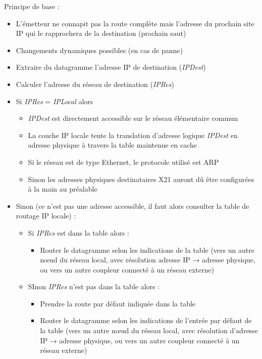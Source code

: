 \documentclass[journal, a4paper]{IEEEtran}
\begin{document}
Principe de base :
\begin{itemize}
	\item L'émetteur ne connapit pas la route complète mais l'adresse du prochain site IP qui le rapprochera de la destination (prochain saut)
	\item Changements dynamiques possibles (en cas de panne)
	\item Extraire du datagramme l'adresse IP de destination (\textit{IPDest})
	\item Calculer l'adresse du réseau de destination (\textit{IPRes})
	\item Si \textit{IPRes} = \textit{IPLocal} alors
	\begin{itemize}
		\item \textit{IPDest} est directement accessible sur le réseau élémentaire commun
		\item La couche IP locale tente la translation d'adresse logique \textit{IPDest} en adresse physique à travers la table maintenue en cache
		\item Si le réseau est de type Ethernet, le protocole utilisé est ARP
		\item Sinon les adresses physiques destinataires X21 auront dû être configurées à la main au préalable
	\end{itemize}
	\item Sinon (ce n’est pas une adresse accessible, il faut alors consulter la table de routage IP locale) :
	\begin{itemize}
		\item Si \textit{IPRes} est dans la table alors :
		\begin{itemize}
			\item Router le datagramme selon les indications de la table (vers un autre nœud du réseau local, avec résolution adresse IP → adresse physique, ou vers un autre coupleur connecté à un réseau externe)
		\end{itemize}
		\item SInon \textit{IPRes} n'est pas dans la table alors :
		\begin{itemize}
			\item Prendre la route par défaut indiquée dans la table
			\item Router le datagramme selon les indications de l'entrée par défaut de la table (vers un autre nœud du réseau local, avec résolution d'adresse IP → adresse physique, ou vers un autre coupleur connecté à un réseau externe)
		\end{itemize}
	\end{itemize}
\end{itemize}
~\\
\end{document}
